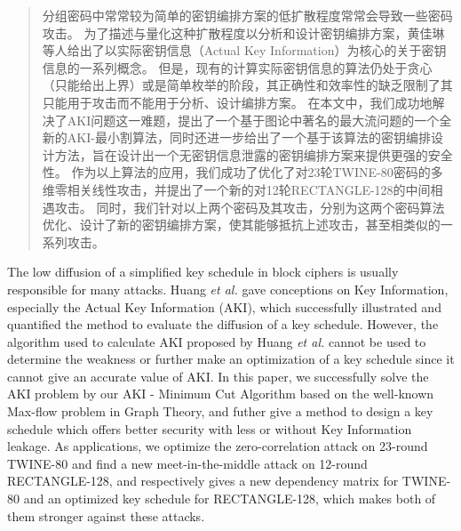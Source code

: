 
\begin{abstract}

分组密码中常常较为简单的密钥编排方案的低扩散程度常常会导致一些密码攻击。
为了描述与量化这种扩散程度以分析和设计密钥编排方案，黄佳琳等人给出了以实际密钥信息（Actual Key Information）为核心的关于密钥信息的一系列概念。
但是，现有的计算实际密钥信息的算法仍处于贪心（只能给出上界）或是简单枚举的阶段，其正确性和效率性的缺乏限制了其只能用于攻击而不能用于分析、设计编排方案。
在本文中，我们成功地解决了AKI问题这一难题，提出了一个基于图论中著名的最大流问题的一个全新的AKI-最小割算法，同时还进一步给出了一个基于该算法的密钥编排设计方法，旨在设计出一个无密钥信息泄露的密钥编排方案来提供更强的安全性。
作为以上算法的应用，我们成功了优化了对23轮TWINE-80密码的多维零相关线性攻击，并提出了一个新的对12轮RECTANGLE-128的中间相遇攻击。
同时，我们针对以上两个密码及其攻击，分别为这两个密码算法优化、设计了新的密钥编排方案，使其能够抵抗上述攻击，甚至相类似的一系列攻击。

\end{abstract}

\begin{englishabstract}

    The low diffusion of a simplified key schedule in block ciphers is usually responsible for many attacks.
    Huang \emph{et al.} gave conceptions on Key Information, especially the Actual Key Information (AKI), which successfully illustrated and quantified the method to evaluate the diffusion of a key schedule.
    However, the algorithm used to calculate AKI proposed by Huang \emph{et al.} cannot be used to determine the weakness or further make an optimization of a key schedule since it cannot give an accurate value of AKI.
    In this paper, we successfully solve the AKI problem by our AKI - Minimum Cut Algorithm based on the well-known Max-flow problem in Graph Theory,
    and futher give a method to design a key schedule which offers better security with less or without Key Information leakage.
    As applications, we optimize the zero-correlation attack on 23-round TWINE-80 and find a new meet-in-the-middle attack on 12-round RECTANGLE-128,
    and respectively gives a new dependency matrix for TWINE-80 and an optimized key schedule for RECTANGLE-128, which makes both of them stronger against these attacks.

\end{englishabstract}

